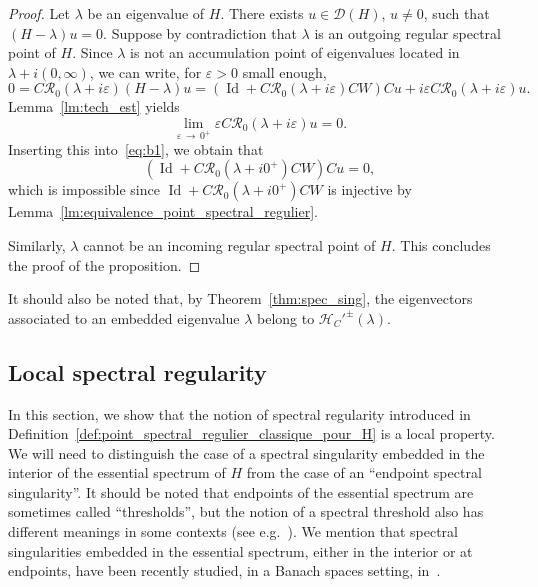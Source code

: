 \documentclass[AHL,Unicode,longabstracts,published]{cedram}
\newcommand{\Hi}{\mathcal{H}}
\newcommand{\Res}{\mathcal{R}}
\newcommand{\clD}{\mathcal{D}}
\DeclareMathOperator{\Id}{Id}
\newcommand{\Hi}{\mathcal{H}}
\begin{document}
\begin{proof}
Let $\lambda$ be an eigenvalue of $H$. There exists $u\in\clD(H)$, $u\neq 0$, such that $(H-\lambda)u=0$. Suppose by contradiction that $\lambda$ is an outgoing regular spectral point of $H$. Since $\lambda$ is not an accumulation point of eigenvalues located in $\lambda+i(0,\infty)$, we can write, for $\varepsilon>0$ small enough,
\begin{equation}\label{eq:b1}
0=C\Res_0(\lambda+i\varepsilon)(H-\lambda)u=(\Id+C\Res_0(\lambda+i\varepsilon)CW)Cu+i\varepsilon C\Res_0(\lambda+i\varepsilon)u.
\end{equation}
Lemma~\ref{lm:tech_est} yields
\begin{equation*}
\lim_{\varepsilon\,\rightarrow\,0^+}\varepsilon C\Res_0(\lambda+i\varepsilon)u=0.
\end{equation*}
Inserting this into~\eqref{eq:b1}, we obtain that
\begin{equation*}
(\Id+C\Res_0(\lambda+i0^+)CW)Cu=0,
\end{equation*}
which is impossible since $\Id+C\Res_0(\lambda+i0^+)CW$ is injective by Lemma~\ref{lm:equivalence_point_spectral_regulier}.

Similarly, $\lambda$ cannot be an incoming regular spectral point of $H$. This concludes the proof of the proposition.
\end{proof}


It should also be noted that, by Theorem~\ref{thm:spec_sing}, the eigenvectors associated to an embedded eigenvalue $\lambda$ belong to $\Hi_C'^\pm(\lambda)$.



\subsection{Local spectral regularity}\label{subsec:local}

In this section, we show that the notion of spectral regularity introduced in Definition~\ref{def:point_spectral_regulier_classique_pour_H} is a local property. We will need to distinguish the case of a spectral singularity embedded in the interior of the essential spectrum of $H$ from the case of an ``endpoint spectral singularity''. It should be noted that endpoints of the essential spectrum are sometimes called ``thresholds'', but the notion of a spectral threshold also has different meanings in some contexts (see e.g.~\cite{Ho74_01}). We mention that spectral singularities embedded in the essential spectrum, either in the interior or at endpoints, have been recently studied, in a Banach spaces setting, in~\cite{BoCo22_01}.
\end{document}
